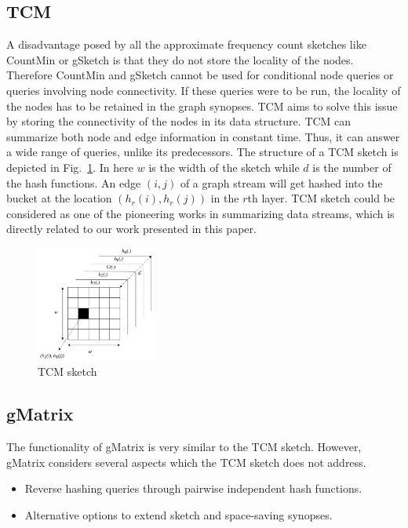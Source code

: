 \subsection{TCM}

A disadvantage posed by all the approximate frequency count sketches like CountMin or gSketch is that they do not store the locality of the nodes. Therefore CountMin and gSketch cannot be used for conditional node queries or queries involving node connectivity. If these queries were to be run, the locality of the nodes has to be retained in the graph synopses. TCM\cite{tang_graph_2016} aims to solve this issue by storing the connectivity of the nodes in its data structure. TCM can summarize both node and edge information in constant time. Thus, it can answer a wide range of queries, unlike its predecessors. The structure of a TCM sketch is depicted in Fig.~\ref{fig:tcm}. In here \(w\) is the width of the sketch while \(d\) is the number of the hash functions. An edge \((i, j)\) of a graph stream will get hashed into the bucket at the location \((h_r(i), h_r(j))\) in the \(r\)th layer. TCM sketch could be considered as one of the pioneering works in summarizing data streams, which is directly related to our work presented in this paper.

\begin{figure}[htbp]
    \centerline{\includegraphics[width=0.35\textwidth]{img/tcm.png}}
    \caption{TCM sketch\cite{khan_query-friendly_2016}}
    \label{fig:tcm}
\end{figure}

\subsection{gMatrix}

The functionality of gMatrix\cite{khan_query-friendly_2016} is very similar to the TCM sketch. However, gMatrix considers several aspects which the TCM sketch does not address.

\begin{itemize}
    \item Reverse hashing queries through pairwise independent hash functions.
    \item Alternative options to extend sketch and space-saving synopses.
\end{itemize}
